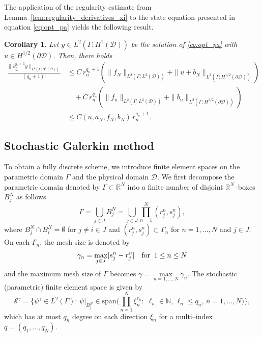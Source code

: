 \documentclass[a4paper,10pt]{article}
\newcommand{\cD}{{\mathcal{D}}}
\newcommand{\R}{{\mathbb{R}}}
\newtheorem{corollary}[theorem]{Corollary}
\numberwithin{theorem}{section}
\begin{document}
The application of the regularity estimate from Lemma~\ref{lem:regularity_derivatives_xi} to the state equation presented in equation \eqref{eq:opt_pa} yields the following result.

\begin{corollary}
  \label{cor:state_regularity_wrt_stochastic}
  Let $y\in L^2(\Gamma;H^1(\cD))$ be the solution of \eqref{eq:opt_pa} with $u\in H^{1/2}(\partial\cD)$. Then, there holds
  \begin{align*}
    \frac{\|\partial_{\xi_n}^{q_n+1} y\|_{L^2(\Gamma; H^1(\cD))}}{(q_n+1)!}
    &\le C\,r_n^{q_n+1}\left(\|f_N\|_{L^2(\Gamma; L^2(\cD))} + \|u+b_N\|_{L^2(\Gamma; H^{1/2}(\partial\cD))}\right) \\
    &\quad + C\,r_n^{q_n}\left(\|f_n\|_{L^2(\Gamma; L^2(\cD))} + \|b_n\|_{L^2(\Gamma; H^{1/2}(\partial\cD))}\right) \\
    &\le C(u,a_N,f_N,b_N)\,r_n^{q_n+1}.
  \end{align*}
\end{corollary}

\subsection{Stochastic Galerkin method}

To obtain a fully discrete scheme, we introduce finite element spaces on the parametric domain $\Gamma$ and the physical domain $\mathcal{D}$. We first decompose the parametric domain denoted by $\Gamma \subset \mathbb{R}^N$ into a finite number of disjoint $\R^N$--boxes $B_j^{N}$ as follows
\[
 \Gamma =  \bigcup \limits_{j \in J} B_j^{N} = \bigcup \limits_{j \in J} \prod \limits_{n=1}^{N} (r_j^{n},s_j^{n}),
\]
where $B_j^{N} \cap B_i^{N} = \emptyset$ for $j \neq i \in J$  and     $(r_j^{n},s_j^{n}) \subset \Gamma_n$ for $n=1,\ldots,N$ and $ j \in J$. On each $\Gamma_n$, the mesh size is denoted by 
\[
\gamma_n = \max \limits_{j \in J} \lvert s_j^{n} - r_j^{n}\rvert \quad \hbox{for} \;\; 1 \leq n \leq N
\]
and the maximum mesh size of $\Gamma$ becomes   $\gamma = \max \limits_{n=1,\ldots, N} \gamma_n$. The stochastic (parametric) finite element space is given by
\begin{equation}
\mathcal S^{\gamma} = \{\psi^{\gamma} \in L^2(\Gamma): \, \psi|_{B_j^N} \in \text{span}\big( \prod \limits_{n=1}^{N} \xi_n^{\ell_n} : \; \ell_n \in \mathbb{N}, \, \ell_n \leq q_n, \, n=1, \ldots, N  \big)\},
\end{equation}
which  has at most $q_n$ degree on each direction $\xi_n$ for a multi--index $q = (q_1,\ldots,q_N)$. 
\end{document}
